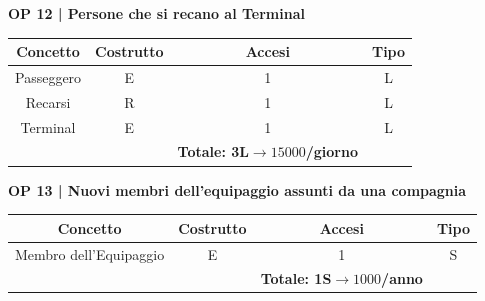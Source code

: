 \vspace{.6cm}


\textbf{\small OP 12 | Persone che si recano al Terminal}\\

\begin{tabular}{ c c c c} %
	\hline
	\textbf{Concetto} & \textbf{Costrutto} & \textbf{Accesi} & \textbf{Tipo}\\
	\hline
	\textsf{\small Passeggero} & \textsf{\small E} & \textsf{\small 1} &  \textsf{\small L}\\
	\hline
	\textsf{\small Recarsi} & \textsf{\small R} & \textsf{\small 1} &  \textsf{\small L}\\
	\textsf{\small Terminal} & \textsf{\small E} & \textsf{\small 1} &  \textsf{\small L}\\
	\hline
	\hline
	\textsf{\small } & \textsf{\small } & \textbf{Totale: 3L$\rightarrow 15000$/giorno } \textsf{\small } & \textsf{\small }\\ %
	\hline
\end{tabular}

\vspace{.6cm}


\textbf{\small OP 13 | Nuovi membri dell'equipaggio assunti da una compagnia}\\

\begin{tabular}{ c c c c} %
	\hline
	\textbf{Concetto} & \textbf{Costrutto} & \textbf{Accesi} & \textbf{Tipo}\\
	\hline
	\textsf{\small Membro dell'Equipaggio} & \textsf{\small E} & \textsf{\small 1} &  \textsf{\small S}\\
	\hline
	\textsf{\small } & \textsf{\small } & \textbf{Totale: 1S$\rightarrow 1000$/anno } \textsf{\small } & \textsf{\small }\\ %
	\hline
\end{tabular}

\vspace{.6cm}

